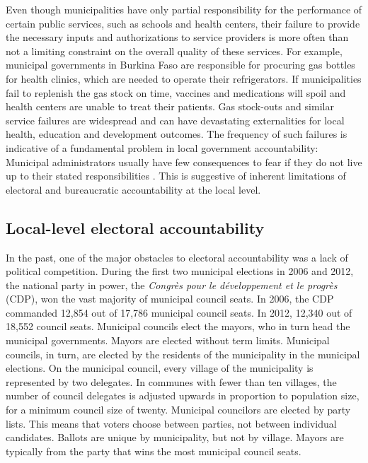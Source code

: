 \documentclass[11pt]{article}
\begin{document}
Even though municipalities have only partial responsibility for the performance of certain public services, such as schools and health centers, their failure to provide the necessary inputs and authorizations to service providers is more often than not a limiting constraint on the overall quality of these services. For example, municipal governments in Burkina Faso are responsible for procuring gas bottles for health clinics, which are needed to operate their refrigerators. If municipalities fail to replenish the gas stock on time, vaccines and medications will spoil and health centers are unable to treat their patients. Gas stock-outs and similar service failures are widespread and can have devastating externalities for local health, education and development outcomes. The frequency of such failures is indicative of a fundamental problem in local government accountability: Municipal administrators usually have few consequences to fear if they do not live up to their stated responsibilities  \citep{Mahieu2010}. This is suggestive of inherent limitations of electoral and bureaucratic accountability at the local level.  

\subsection{Local-level electoral accountability}

In the past, one of the major obstacles to electoral accountability was a lack of political competition. During the first two municipal elections in 2006 and 2012, the national party in power, the \emph{Congr\`{e}s pour le d\'{e}veloppement et le progr\`{e}s} (CDP), won the vast majority of municipal council seats. In 2006, the CDP commanded 12,854 out of 17,786 municipal council seats. In 2012, 12,340 out of 18,552 council seats. Municipal councils elect the mayors, who in turn head the municipal governments. Mayors are elected without term limits. Municipal councils, in turn, are elected by the residents of the municipality in the municipal elections. On the municipal council, every village of the municipality is represented by two delegates. In communes with fewer than ten villages, the number of council delegates is adjusted upwards in proportion to population size, for a minimum council size of twenty. Municipal councilors are elected by party lists. This means that voters choose between parties, not between individual candidates. Ballots are unique by municipality, but not by village. Mayors are typically from the party that wins the most municipal council seats. 
\end{document}
